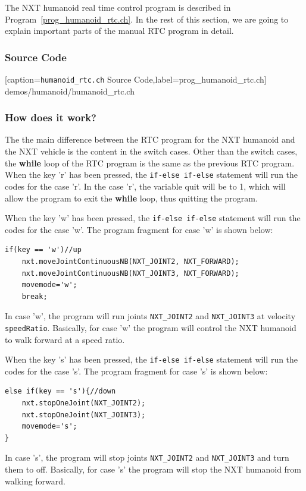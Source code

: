 \documentclass[11pt]{article}
\begin{document}
The NXT humanoid real time control program is described in Program~\ref{prog_humanoid_rtc.ch}. 
In the rest of this section, we are going to explain important parts of the manual RTC program in detail.

\subsubsection*{Source Code}

[caption={{\tt humanoid\_rtc.ch} Source Code},label=prog_humanoid_rtc.ch]
{demos/humanoid/humanoid_rtc.ch}

\subsubsection*{How does it work?}
The the main difference between the RTC program for the NXT humanoid and the NXT vehicle is the content 
in the switch cases. Other than the switch cases, the {\bf while} loop of the RTC program is the same as the 
previous RTC program. When the key 'r' has been pressed, the \verb+if-else if-else+ statement will run the codes 
for the case 'r'. In the case 'r', the variable quit will be to 1, which will allow the program to exit 
the {\bf while} loop, thus quitting the program.\\
\newline

When the key 'w' has been pressed, the \verb+if-else if-else+ statement will run the codes for the case 'w'.
The program fragment for case 'w' is shown below:
\begin{lstlisting}
if(key == 'w')//up
    nxt.moveJointContinuousNB(NXT_JOINT2, NXT_FORWARD);
    nxt.moveJointContinuousNB(NXT_JOINT3, NXT_FORWARD);
    movemode='w';
    break;
\end{lstlisting}
In case 'w', the program will run joints \verb+NXT_JOINT2+ and \verb+NXT_JOINT3+ at velocity \verb+speedRatio+. 
Basically, for case 'w' the program will control the NXT humanoid to walk forward at a speed ratio.\\
\newline

When the key 's' has been pressed, the \verb+if-else if-else+ statement will run the codes for the case 's'.
The program fragment for case 's' is shown below:
\begin{lstlisting}
else if(key == 's'){//down
    nxt.stopOneJoint(NXT_JOINT2);
    nxt.stopOneJoint(NXT_JOINT3);
    movemode='s';
}
\end{lstlisting}
In case 's', the program will stop joints \verb+NXT_JOINT2+ and \verb+NXT_JOINT3+ and turn them to off.
Basically, for case 's' the program will stop the NXT humanoid from walking forward.\\
\newline
\end{document}
